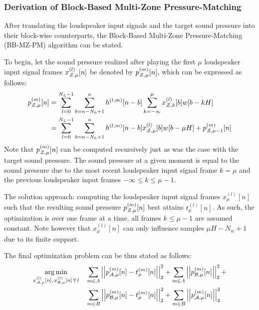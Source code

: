 \subsubsection*{Derivation of Block-Based Multi-Zone Pressure-Matching}
After translating the loudspeaker input signals and the target sound pressure into their block-wise counterparts, 
the Block-Based Multi-Zone Pressure-Matching (BB-MZ-PM) algorithm can be stated.

To begin, let the sound pressure realized after playing the first $\mu$ loudspeaker input signal frames $x^{(l)}_{\mathcal{Z},\mu}[n]$ be denoted by $p_{\mathcal{Z},\mu}^{(m)}[n]$,
which can be expressed as follows:
\begin{align}
    p_{\mathcal{Z},\mu}^{(m)}[n] &= \sum_{l=0}^{N_L - 1} \sum_{b = n - N_h + 1}^{n} h^{(l,m)}[n - b] \sum_{k=-\infty}^{\mu} x^{(l)}_{\mathcal{Z},k}[b] w[b - kH] \\
                   &= \sum_{l=0}^{N_L - 1} \sum_{b = n - N_h + 1}^{n} h^{(l,m)}[n - b]  x^{(l)}_{\mathcal{Z},\mu}[b]w[b - \mu H] + p_{\mathcal{Z},\mu-1}^{(m)}[n]
\end{align}
Note that $p_{\mathcal{Z},\mu}^{(m)}[n]$ can be computed recursively just as was the case with the target sound pressure.
The sound pressure at a given moment is equal to the sound pressure due to the most recent loudspeaker input signal frame $k = \mu$ and the previous loudspeaker input frames $-\infty \leq k \leq \mu - 1$.

The solution approach: computing the loudspeaker input signal frames $x_\mu^{(l)}[n]$ such that the resulting sound pressure $p_{\mathcal{Z},\mu}^{(m)}[n]$ best attains $t_\mu^{(l)}[n]$.
As such, the optimization is over one frame at a time, all frames $k \leq \mu - 1$ are assumed constant. 
Note however that $x_\mu^{(l)}[n]$ can only influence samples $\mu H - N_w + 1$ due to its finite support.

The final optimization problem can be thus stated as follows:
\begin{align}
    \argmin{x_{\za,\mu}^{(l)}[n],\,x_{\zb,\mu}^{(l)}[n]\,\forall\,l}{
       &\sum_{m\in A} \norm[2][2]{p_{\za,\mu}^{(m)}[n] - t_\mu^{(m)}[n]} +
        \sum_{m\in A} \norm[2][2]{p_{\zb,\mu}^{(m)}[n]} + \\
       &\sum_{m\in B} \norm[2][2]{p_{\zb,\mu}^{(m)}[n] - t_\mu^{(m)}[n]} + 
        \sum_{m\in B} \norm[2][2]{p_{\za,\mu}^{(m)}[n]}
    }
\end{align}

